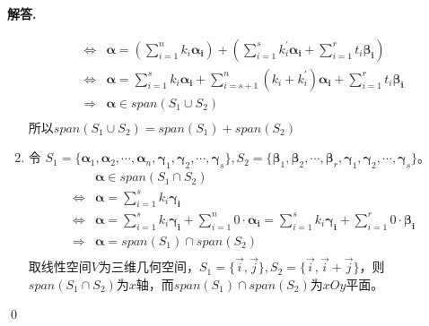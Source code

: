 \documentclass[12pt, a4paper, oneside]{ctexart}
\newenvironment{solution}{\par\noindent\textbf{解答. }}{\\\par}
\begin{document}
\begin{solution}
\begin{enumerate}
\begin{align*}
            \Leftrightarrow&\mathbf{\alpha}=(\sum_{i=1}^{n}k_i\mathbf{\alpha_i})+(\sum_{i=1}^{s}k_i^{\prime}\mathbf{\alpha_i}+\sum_{i=1}^{r}t_i\mathbf{\beta_i})\\
            \Leftrightarrow&\mathbf{\alpha}=\sum_{i=1}^{s} k_i\mathbf{\alpha_i}+\sum_{i=s+1}^{n}(k_i+k_i^{\prime})\mathbf{\alpha_i}+\sum_{i=1}^{r}t_i\mathbf{\beta_i}\\
            \Rightarrow&\mathbf{\alpha}\in span(S_1\cup S_2)\\
        \end{align*}
        所以$span(S_1\cup S_2)=span(S_1)+span(S_2)$
        \item 令 $S_1=\{\mathbf{\alpha}_1,\mathbf{\alpha}_2,\cdots,\mathbf{\alpha}_n,\mathbf{\gamma}_1,\mathbf{\gamma}_2,\cdots,\mathbf{\gamma}_s\},S_2=\{\mathbf{\beta}_1,\mathbf{\beta}_2,\cdots,\mathbf{\beta}_r,\mathbf{\gamma}_1,\mathbf{\gamma}_2,\cdots,\mathbf{\gamma}_s\}$。
         \begin{align*}
            &\mathbf{\alpha}\in span(S_1\cap S_2)\\
            \Leftrightarrow&\mathbf{\alpha}=\sum_{i=1}^{s}k_i\mathbf{\gamma_i}\\
            \Leftrightarrow&\mathbf{\alpha}=\sum_{i=1}^{s}k_i\mathbf{\gamma_i}+\sum_{i=1}^{n}0\cdot\mathbf{\alpha_i}=\sum_{i=1}^{s}k_i\mathbf{\gamma_i}+\sum_{i=1}^{r}0\cdot\mathbf{\beta_i}\\
            \Rightarrow&\mathbf{\alpha}= span(S_1)\cap span(S_2)\\
        \end{align*}
        取线性空间$V$为三维几何空间，$S_1=\{\vec{i},\vec{j}\},S_2=\{\vec{i},\vec{i}+\vec{j}\}$，则 $span(S_1\cap S_2)$为$x$轴，而$span(S_1)\cap span(S_2)$为$xOy$平面。
    \end{enumerate}
    \qed
\end{solution}
\end{document}
